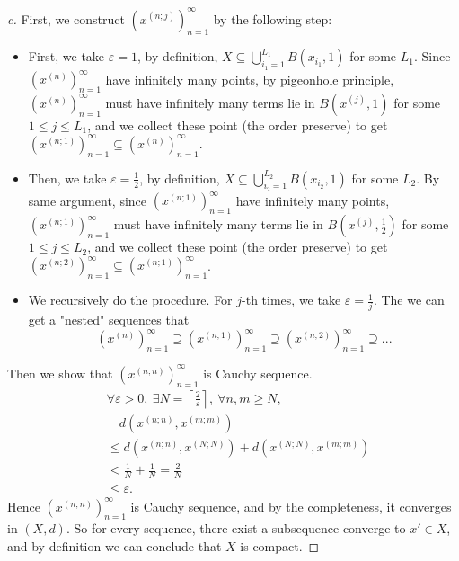 \begin{proof}[c]
    First, we construct $(x^{(n;j)})_{n=1}^\infty$ by the following step:
    \begin{itemize}
        \item First, we take $\varepsilon = 1$, by definition, $X \subseteq \bigcup_{i_1=1}^{L_1} B(x_{i_1}, 1)$ for some $L_1$. Since $(x^{(n)})_{n=1}^\infty$ have infinitely many points, by pigeonhole principle, $(x^{(n)})_{n=1}^\infty$ must have infinitely many terms lie in $B(x^{(j)}, 1)$ for some $1 \leq j \leq L_1$, and we collect these point (the order preserve) to get $(x^{(n;1)})_{n=1}^\infty \subseteq (x^{(n)})_{n=1}^\infty$.
        \item Then, we take $\varepsilon = \frac{1}{2}$, by definition, $X \subseteq \bigcup_{i_2=1}^{L_2} B(x_{i_2}, 1)$ for some $L_2$. By same argument, since $(x^{(n;1)})_{n=1}^\infty$ have infinitely many points, $(x^{(n;1)})_{n=1}^\infty$ must have infinitely many terms lie in $B(x^{(j)}, \frac{1}{2})$ for some $1 \leq j \leq L_2$, and we collect these point (the order preserve) to get $(x^{(n;2)})_{n=1}^\infty \subseteq (x^{(n;1)})_{n=1}^\infty$.
        \item We recursively do the procedure. For $j$-th times, we take $\varepsilon = \frac{1}{j}$. The we can get a "nested" sequences that 
        \[
        (x^{(n)})_{n=1}^\infty  \supseteq(x^{(n;1)})_{n=1}^\infty \supseteq(x^{(n;2)})_{n=1}^\infty \supseteq ...
        \]
    \end{itemize}
    Then we show that $(x^{(n;n)})_{n=1}^\infty$ is Cauchy sequence. \\
    \begin{align*}
    &\forall \varepsilon > 0,\ \exists N = \left\lceil \tfrac{2}{\varepsilon} \right\rceil,\ 
       \forall n, m \geq N, \\[6pt]
    &\quad d(x^{(n;n)}, x^{(m;m)}) \\
    &\leq d(x^{(n;n)}, x^{(N;N)}) + d(x^{(N;N)}, x^{(m;m)}) \\[6pt]
    &< \tfrac{1}{N} + \tfrac{1}{N} = \tfrac{2}{N} \\[6pt]
    &\leq \varepsilon.
    \end{align*}
    Hence $(x^{(n;n)})_{n=1}^\infty$ is Cauchy sequence, and by the completeness, it converges in $(X, d)$. So for every sequence, there exist a subsequence converge to $x' \in X$, and by definition we can conclude that $X$ is compact.
\end{proof}


